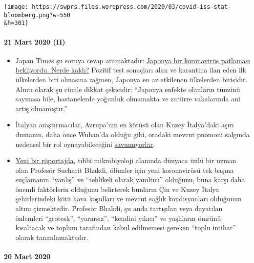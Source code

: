 \texttt{[image: https://swprs.files.wordpress.com/2020/03/covid-iss-stat-bloomberg.png?w=550\\\&h=301]}

\hypertarget{21-mart-2020-ii}{%
\paragraph{21 Mart 2020 (II)}\label{21-mart-2020-ii}}

\begin{itemize}
\tightlist
\item
  Japan Times şu soruya cevap aramaktadır:
  \href{https://www.japantimes.co.jp/news/2020/03/20/national/coronavirus-explosion-expected-japan/}{Japonya
  bir koronavirüs patlaması bekliyordu. Nerde kaldı?} Pozitif test
  sonuçları alan ve karantina ilan eden ilk ülkelerden biri olmasına
  rağmen, Japonya en az etkilenen ülkelerden birisidir. Alıntı olarak şu
  cümle dikkat çekicidir: ``Japonya enfekte olanların tümünü saymasa
  bile, hastanelerde yoğunluk olmamakta ve zatürre vakalarında ani artış
  olmamıştır.''
\item
  İtalyan araştırmacılar, Avrupa'nın en kötüsü olan Kuzey İtalya'daki
  aşırı dumanın, daha önce Wuhan'da olduğu gibi, oradaki mevcut pnömoni
  salgında nedensel bir rol oynayabileceğini
  \href{https://www.heise.de/tp/features/Feinstaubpartikel-als-Viren-Vehikel-4687454.html}{savunuyorlar}.
\item
  \href{https://www.youtube.com/watch?v=JBB9bA-gXL4}{Yeni bir
  röportajda}, tıbbi mikrobiyoloji alanında dünyaca ünlü bir uzman olan
  Profesör Sucharit Bhakdi, ölümler için yeni koronavirüsü tek başına
  suçlamanın ``yanlış'' ve ``tehlikeli olarak yanıltıcı'' olduğunu, buna
  karşı daha önemli faktörlerin olduğunu belirterek bunların Çin ve
  Kuzey İtalya şehirlerindeki kötü hava koşulları ve mevcut sağlık
  kondisyonları olduğunun altını çizmektedir. Profesör Bhakdi, şu anda
  tartışılan veya dayatılan önlemleri ``grotesk'', ``yararsız'',
  ``kendini yıkıcı'' ve yaşlıların ömrünü kısaltacak ve toplum
  tarafından kabul edilmemesi gereken ``toplu intihar'' olarak
  tanımlamaktadır.
\end{itemize}

\hypertarget{20-mart-2020}{%
\paragraph{20 Mart 2020}\label{20-mart-2020}}

